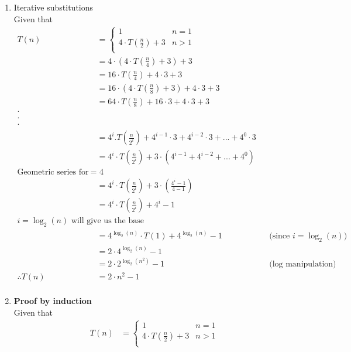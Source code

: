 \documentclass[a4paper,11pt]{article}
\theoremstyle{quest}
\newenvironment{solution}[2][Solution]{\begin{trivlist}
		\item[\hskip \labelsep {\bfseries #1}\hskip \labelsep {\bfseries #2.}]}{\end{trivlist}}
\begin{document}
\newpage
\begin{solution}3
	\begin{enumerate}
		\item Iterative substitutions \\
		Given that 
		\begin{align*}
		T(n)&=\begin{cases}
		1 & \text{$n = 1$}\\
		4 \cdot T(\frac{n}{2}) + 3 & \text{$n > 1$} \\
		\end{cases}\\
		&= 4 \cdot (4 \cdot T(\frac{n}{4})+ 3) + 3 \\
		&= 16 \cdot T(\frac{n}{4}) + 4 \cdot 3 + 3 \\
		&= 16 \cdot (4 \cdot T(\frac{n}{8})+ 3) + 4 \cdot 3 + 3 \\
		&= 64 \cdot T(\frac{n}{8}) + 16 \cdot 3 + 4 \cdot 3 + 3 \\
		\cdot \\
		\cdot \\
		\cdot \\
		&= 4^{i}.T(\frac{n}{2^{i}}) + 4^{i-1} \cdot 3 + 4^{i-2} \cdot 3 + ...+ 4^{0} \cdot 3 \\
		&= 4^{i}\cdot T(\frac{n}{2^{i}}) + 3\cdot(4^{i-1} + 4^{i-2} + ...+ 4^{0}) \\
		\text{Geometric series for ratio r $=$ 4} \\
		&= 4^{i}\cdot T(\frac{n}{2^{i}}) + 3\cdot(\frac{4^{i} - 1}{4-1} )\\
		&= 4^{i}\cdot T(\frac{n}{2^{i}}) + {4^{i} - 1}\\
		\text {$i = \log_2(n)$ will give us the base case},\\
		&= 4^{\log_2(n)}\cdot T(1) + 4^{\log_2(n)} -1 && \text{(since $i = \log_2(n)$)}\\
		&= 2 \cdot 4^{\log_2(n)} -1\\
		&= 2\cdot 2^{\log_2(n^{2})} -1 && \text{(log manipulation)}\\
		\therefore	T(n)&= 2 \cdot n^{2} - 1 \\	
		\end{align*}
		
		\item
		\textbf{Proof by induction}\\
		Given that 
		\begin{align*}
		T(n)&=\begin{cases}
		1 & \text{$n = 1$}\\
		4 \cdot T(\frac{n}{2}) + 3 & \text{$n > 1$} \\
		\end{cases}
		\end{align*}
		

\end{enumerate}
\end{solution}
\end{document}
